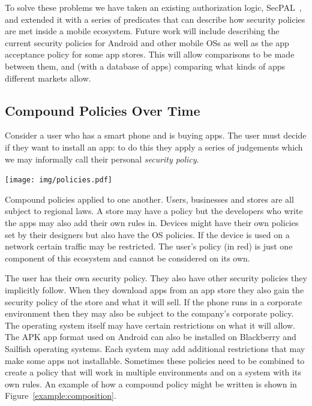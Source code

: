 \documentclass[a4paper]{article}
\begin{document}
To solve these problems we have taken an existing authorization logic,
SecPAL~\cite{Becker:2006vh}, and extended it with a series of predicates that
can describe how security policies are met inside a mobile ecosystem.  Future
work will include describing the current security policies for Android and other
mobile OSs as well as the app acceptance policy for some app stores.  This will
allow comparisons to be made between them, and (with a database of apps)
comparing what kinds of apps different markets allow.

\subsection{Compound Policies Over Time}\label{sec:polovertime}

Consider a user who has a smart phone and is buying apps.  The user must decide
if they want to install an app: to do this they apply a series of judgements
which we may informally call their personal \emph{security policy}.  

\begin{marginfigure}
  \texttt{[image: img/policies.pdf]}
  \caption{Compound policies applied to one another.  Users, businesses
  and stores are all subject to regional laws.  A store may have a policy but
the developers who write the apps may also add their own rules in.  Devices
might have their own policies set by their designers but also have the OS
policies.  If the device is used on a network certain traffic may be restricted.
The user's policy (in red) is just one component of this ecosystem and cannot be
considered on its own.}
  \label{fig:policies}
\end{marginfigure}

The user has their own security policy. They also have other security policies
they implicitly follow.  When they download apps from an app store they also
gain the security policy of the store and what it will sell.  If the phone runs
in a corporate environment then they may also be subject to the company's
corporate policy.  The operating system itself may have certain restrictions on
what it will allow.  The APK app format used on Android can also be installed on
Blackberry and Sailfish operating systems.  Each system may add additional
restrictions that may make some apps not installable.  Sometimes these policies
need to be combined to create a policy that will work in multiple environments
and on a system with its own rules.  An example of how a compound policy might
be written is shown in Figure~\ref{example:composition}.
\end{document}
